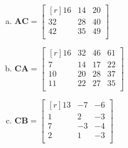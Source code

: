 \documentclass[letterpaper,fleqn]{article}
\begin{document}
\begin{enumerate}
\begin{enumerate}
\begin{enumerate}[(a)]
				\item $\textbf{AC}=\begin{bmatrix*}[r]
					16 & 14 & 20 \\
					32 & 28 & 40 \\
					42 & 35 & 49 \\
				\end{bmatrix*}$
				
				\item $\textbf{CA}=\begin{bmatrix*}[r]
					16 & 32 & 46 & 61 \\
					7 & 14 & 17 & 22 \\
					10 & 20 & 28 & 37 \\
					11 & 22 & 27 & 35 \\
				\end{bmatrix*}$
				
				\item $\textbf{CB}=\begin{bmatrix*}[r]
					13 & -7 & -6 \\
					1 & 2 & -3 \\
					7 & -3 & -4 \\
					2 & 1 & -3 \\
				\end{bmatrix*}$
			\end{enumerate}
			
			
			

\end{enumerate}
\end{enumerate}
\end{document}
